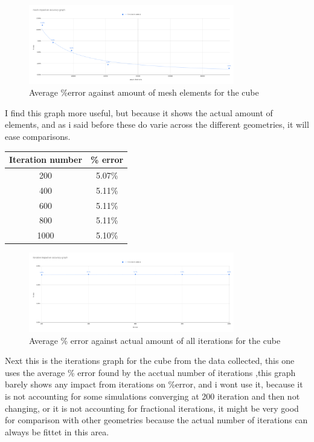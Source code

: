 \documentclass[12pt,a4paper]{article}
\begin{document}
\begin{figure}[H]
\centering
\includegraphics[width=0.8\textwidth]{image14.png}
\caption{Average \%error against amount of mesh elements for the cube}
\end{figure}

I find this graph more useful, but because it shows the actual amount of elements, and as i said before these do varie across the different geometries, it will ease comparisons.


\begin{table}[H]
\centering
\begin{tabular}{|c|c|}
\hline
\textbf{Iteration number} & \textbf{\% error} \\
\hline
200 & 5.07\% \\
\hline
400 & 5.11\% \\
\hline
600 & 5.11\% \\
\hline
800 & 5.11\% \\
\hline
1000 & 5.10\% \\
\hline
\end{tabular}
\end{table}

\begin{figure}[H]
\centering
\includegraphics[width=0.8\textwidth]{image4.png}
\caption{Average \% error against actual amount of all iterations for the cube}
\end{figure}

Next this is the iterations graph for the cube from the data collected, this one uses the average \% error found by the acctual number of iterations ,this graph barely shows any impact from iterations on \%error, and i wont use it, because it is not accounting for some simulations converging at 200 iteration and then not changing, or it is not accounting for fractional iterations, it might be very good for comparison with other geometries because the actual number of iterations can always be fittet in this area.
\end{document}
